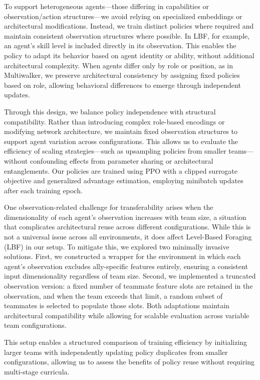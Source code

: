 To support heterogeneous agents—those differing in capabilities or observation/action 
structures—we avoid relying on specialized embeddings or architectural modifications. 
Instead, we train distinct policies where required and maintain consistent observation 
structures where possible. In LBF, for example, an agent's skill level is included 
directly in its observation. This enables the policy to adapt its behavior based on 
agent identity or ability, without additional architectural complexity. 
When agents differ only by role or position, as in Multiwalker, 
we preserve architectural consistency by assigning fixed policies based on role, 
allowing behavioral differences to emerge through independent updates.

Through this design, we balance policy independence with structural compatibility. 
Rather than introducing complex role-based encodings or modifying network architecture, 
we maintain fixed observation structures to support agent variation across configurations. 
This allows us to evaluate the efficiency of scaling strategies—such as upsampling policies from 
smaller teams—without confounding effects from parameter sharing or architectural entanglements. 
Our policies are trained using PPO with a clipped surrogate objective and generalized 
advantage estimation, employing minibatch updates after each training epoch.

One observation-related challenge for transferability arises when the dimensionality 
of each agent's observation increases with team size, a situation that complicates 
architectural reuse across different configurations. While this is not a universal issue 
across all environments, it does affect Level-Based Foraging (LBF) in our setup. 
To mitigate this, we explored two minimally invasive solutions. First, we constructed a wrapper 
for the environment in which each agent's observation excludes ally-specific features entirely, 
ensuring a consistent input dimensionality regardless of team size. Second, 
we implemented a truncated observation version: a fixed number of teammate feature slots 
are retained in the observation, and when the team exceeds that limit, a random subset of 
teammates is selected to populate those slots. Both adaptations maintain architectural 
compatibility while allowing for scalable evaluation across variable team configurations.

This setup enables a structured comparison of training efficiency by initializing larger teams 
with independently updating policy duplicates from smaller configurations, allowing us to assess 
the benefits of policy reuse without requiring multi-stage curricula.

